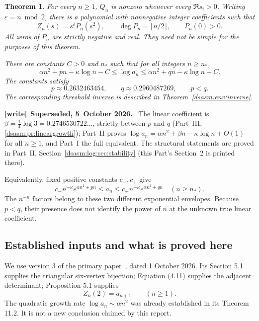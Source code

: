 \documentclass[11pt,letterpaper]{article}
\newtheorem{theorem}{Theorem}[section]
\theoremstyle{remark}\newtheorem{remark}[theorem]{Remark}
\newcommand{\eps}{\varepsilon}\newcommand{\HH}{\mathcal H}\newcommand{\one}{\mathbf1}
\newenvironment{writenote}[1][]{\par\smallskip\begingroup\small
 \noindent\textbf{[write]}\if\relax\detokenize{#1}\relax\else~\textbf{#1.}\fi\ }%
 {\par\endgroup\smallskip}
\begin{document}
\begin{theorem}\label{dsasm:env:main}
For every $n\ge1$, $Q_n$ is nonzero whenever every $\Re s_i>0$.
Writing $\eps=n\bmod2$, there is a polynomial with nonnegative integer
coefficients such that
\begin{equation}\label{dsasm:env:paritypoly}
 Z_n(s)=s^\eps P_n(s^2),\qquad
 \deg P_n=\lfloor n/2\rfloor,\qquad P_n(0)>0.
\end{equation}
All zeros of $P_n$ are strictly negative and real. They need not be
simple for the purposes of this theorem.

There are constants $C>0$ and $n_*$ such that for all integers $n\ge n_*$,
\begin{equation}\label{dsasm:env:envelopes}
 \alpha n^2+pn-\kappa\log n-C
 \le\log a_n\le
 \alpha n^2+qn-\kappa\log n+C.
\end{equation}
The constants satisfy
\begin{equation}\label{dsasm:env:decimalshort}
 p\approx0.2632463454,\qquad q\approx0.2960487269,\qquad p<q.
\end{equation}
The corresponding threshold inverse is described in
Theorem~\ref{dsasm:env:inverse}.
\end{theorem}
\begin{writenote}[Superseded, 5~October 2026]
The linear coefficient is $\beta=\frac14\log3=0.2746530722\ldots$, strictly between $p$ and $q$ (Part~III, \eqref{dsasm:pr:lineargrowth}); Part~II proves $\log a_n=\alpha n^2+\beta n-\kappa\log n+O(1)$ for all $n\ge1$, and Part~I the full equivalent. The structural statements are proved in Part~II, Section~\ref{dsasm:log:sec:stability} (this Part's Section~2 is printed there).
\end{writenote}


Equivalently, fixed positive constants $c_-,c_+$ give
\[
 c_- n^{-\kappa}e^{\alpha n^2+pn}
 \le a_n\le
 c_+ n^{-\kappa}e^{\alpha n^2+qn}
 \quad(n\ge n_*).
\]
The $n^{-\kappa}$ factors belong to these two different exponential
envelopes. Because $p<q$, their presence does not identify the power
of $n$ at the unknown true linear coefficient.

\subsection{Established inputs and what is proved here}
We use version 3 of the primary paper~\cite{bfk}, dated 1 October 2026.
Its Section 5.1 supplies the triangular six-vertex bijection;
Equation (4.11) supplies the adjacent determinant;
Proposition 5.1 supplies
\begin{equation}\label{dsasm:env:adjacentcount}
 Z_n(2)=a_{n+1}\qquad(n\ge1).
\end{equation}
The quadratic growth rate $\log a_n\sim\alpha n^2$ was already
established in its Theorem 11.2. It is not a new conclusion claimed
by this report.
\end{document}
